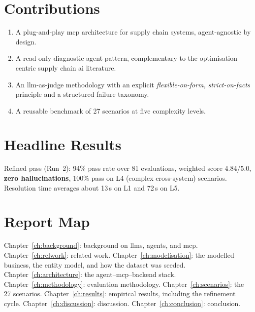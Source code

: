 \section{Contributions}

\begin{enumerate}
    \item A plug-and-play \gls{mcp} architecture for supply chain systems, agent-agnostic by design.
    \item A read-only diagnostic agent pattern, complementary to the optimisation-centric supply chain \gls{ai} literature.
    \item An \gls{llm}-as-judge methodology with an explicit \emph{flexible-on-form, strict-on-facts} principle and a structured failure taxonomy.
    \item A reusable benchmark of 27 scenarios at five complexity levels.
\end{enumerate}

\section{Headline Results}

Refined pass (Run~2): 94\% pass rate over 81 evaluations, weighted score 4.84/5.0, \textbf{zero hallucinations}, 100\% pass on L4 (complex cross-system) scenarios. Resolution time averages about 13\,s on L1 and 72\,s on L5.

\section{Report Map}

Chapter~\ref{ch:background}: background on \gls{llm}s, agents, and \gls{mcp}. Chapter~\ref{ch:relwork}: related work. Chapter~\ref{ch:modelisation}: the modelled business, the entity model, and how the dataset was seeded. Chapter~\ref{ch:architecture}: the agent--\gls{mcp}--backend stack. Chapter~\ref{ch:methodology}: evaluation methodology. Chapter~\ref{ch:scenarios}: the 27 scenarios. Chapter~\ref{ch:results}: empirical results, including the refinement cycle. Chapter~\ref{ch:discussion}: discussion. Chapter~\ref{ch:conclusion}: conclusion.
